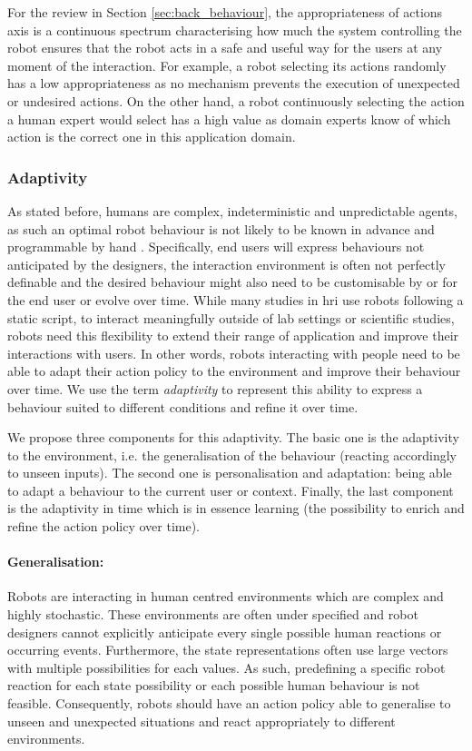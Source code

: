     For the review in Section \ref{sec:back_behaviour}, the appropriateness of actions axis is a continuous spectrum characterising how much the system controlling the robot ensures that the robot acts in a safe and useful way for the users at any moment of the interaction. For example, a robot selecting its actions randomly has a low appropriateness as no mechanism prevents the execution of unexpected or undesired actions. On the other hand, a robot continuously selecting the action a human expert would select has a high value as domain experts know of which action is the correct one in this application domain.


\subsubsection{Adaptivity}	\label{ssec:adap}
    As stated before, humans are complex, indeterministic and unpredictable agents, as such an optimal robot behaviour is not likely to be known in advance and programmable by hand \citep{dautenhahn2004robots,argall2009survey}. Specifically, end users will express behaviours not anticipated by the designers, the interaction environment is often not perfectly definable and the desired behaviour might also need to be customisable by or for the end user or evolve over time. While many studies in \gls{hri} use robots following a static script, to interact meaningfully outside of lab settings or scientific studies, robots need this flexibility to extend their range of application and improve their interactions with users. In other words, robots interacting with people need to be able to adapt their action policy to the environment and improve their behaviour over time. We use the term \emph{adaptivity} to represent this ability to express a behaviour suited to different conditions and refine it over time. 
    
    We propose three components for this adaptivity. The basic one is the adaptivity to the environment, i.e. the generalisation of the behaviour (reacting accordingly to unseen inputs). The second one is personalisation and adaptation: being able to adapt a behaviour to the current user or context. Finally, the last component is the adaptivity in time which is in essence learning (the possibility to enrich and refine the action policy over time). 
       
    \paragraph{Generalisation:} Robots are interacting in human centred environments which are complex and highly stochastic. These environments are often under specified and robot designers cannot explicitly anticipate every single possible human reactions or occurring events. Furthermore, the state representations often use large vectors with multiple possibilities for each values. As such, predefining a specific robot reaction for each state possibility or each possible human behaviour is not feasible. Consequently, robots should have an action policy able to generalise to unseen and unexpected situations and react appropriately to different environments.
    
